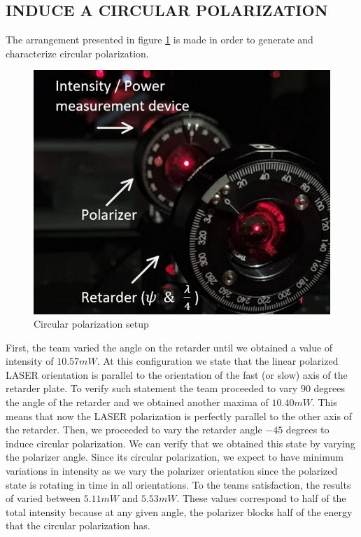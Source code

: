 \subsection{INDUCE A CIRCULAR POLARIZATION}
The arrangement presented in figure \ref{fig:CircularPolS1} is made in order to generate and characterize circular polarization.
\begin{figure}[H]
    \centering
    \includegraphics[scale=0.30]{Figures/Polarization_Setup3.png}
    \caption{Circular polarization setup}
    \label{fig:CircularPolS1}
\end{figure}
First, the team varied the angle on the retarder until we obtained a value of intensity of $10.57 mW$. At this configuration we state that the linear polarized LASER orientation is parallel to the orientation of the fast (or slow) axis of the retarder plate. To verify such statement the team proceeded to vary $90$ degrees the angle of the retarder and we obtained another maxima of $10.40 mW$. This means that now the LASER polarization is perfectly parallel to the other axis of the retarder. Then, we proceeded to vary the retarder angle $-45$ degrees to induce circular polarization. We can verify that we obtained this state by varying the polarizer angle. Since its circular polarization, we expect to have minimum variations in intensity as we vary the polarizer orientation since the polarized state is rotating in time in all orientations. To the teams satisfaction, the results of varied between $5.11 mW$ and $5.53 mW$. These values correspond to half of the total intensity because at any given angle, the polarizer blocks half of the energy that the circular polarization has. \\


